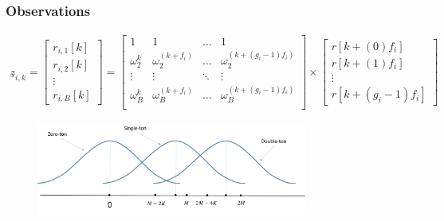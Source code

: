 \documentclass[10pt,xcolor=table]{beamer}
\newcommand{\zv}{\underline{z}}
\begin{document}
\begin{frame}\frametitle{Observations}
\begin{align} \nonumber
	    		\zv_{i,k} = \begin{bmatrix}
	    		r_{i,1}[k]\\
	    		r_{i,2}[k]\\
	    		\vdots\\
	    		r_{i,B}[k]
	    		\end{bmatrix}			
            = \begin{bmatrix}
			1 & 1 & \ldots & 1 \\
			\omega^{k}_{2} & \omega^{(k+f_i)}_{2} & \ldots & \omega^{(k+(g_i-1)f_i)}_{2}   \\
			\vdots & \vdots & \ddots & \vdots\\
			\omega^{k}_{B} & \omega^{(k+f_i)}_{B} & \ldots & \omega^{(k+(g_i-1)f_i)}_{B} \\
			\end{bmatrix} \times
			\begin{bmatrix}
			r[k+(0)f_i] \\
			r[k+(1)f_i] \\
			\vdots\\
			r[k+(g_i-1)f_i]
			\end{bmatrix}
			\end{align}

			\begin{figure}[t]
			\begin{center}
				\includegraphics[width=3.5in]{bin_statistics.png}
			\end{center}
		\end{figure}

\end{frame}
\end{document}
